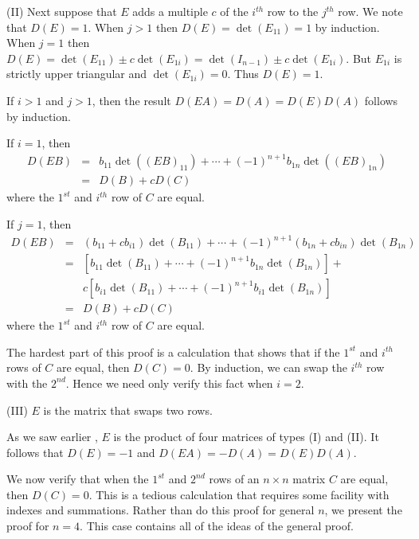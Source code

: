 \documentclass{ximera}
\begin{document}
\noindent (II) Next suppose that $E$ adds a multiple $c$ of the
$i^{th}$ row to the $j^{th}$ row.  We note that $D(E)=1$.  When
$j>1$ then $D(E)=\det(E_{11})=1$ by induction.  When $j=1$ then
$D(E)= \det(E_{11})\pm c\det(E_{1i})=\det(I_{n-1})\pm
c\det(E_{1i})$. But $E_{1i}$ is strictly upper triangular and
$\det(E_{1i})=0$.  Thus $D(E)=1$. 

If $i>1$ and $j>1$, then the result $D(EA)=D(A)=D(E)D(A)$
follows by induction.  

If $i=1$, then
\begin{eqnarray*}
D(EB) & = & b_{11}\det((EB)_{11})+\cdots+(-1)^{n+1}b_{1n}\det((EB)_{1n})\\
& = & D(B) + cD(C)
\end{eqnarray*}
where the $1^{st}$ and $i^{th}$ row of $C$ are equal.

If $j=1$, then 
\begin{eqnarray*}
D(EB) & = & (b_{11}+cb_{i1})\det(B_{11}) +\cdots+ 
(-1)^{n+1}(b_{1n}+cb_{in})\det(B_{1n})\\
& = &
\left[b_{11}\det(B_{11})+\cdots+(-1)^{n+1}b_{1n}\det(B_{1n})\right]
+ 
\\ & & 
        c\left[b_{i1}\det(B_{11})+\cdots+(-1)^{n+1}b_{i1}\det(B_{1n})\right]\\
& = & D(B) + cD(C)
\end{eqnarray*}
where the $1^{st}$ and $i^{th}$ row of $C$ are equal.  

The hardest part of this proof is a calculation that shows that
if the $1^{st}$ and $i^{th}$ rows of $C$ are equal, then
$D(C)=0$.  By induction, we can swap the $i^{th}$ row with the
$2^{nd}$.  Hence we need only verify this fact when $i=2$. 

\noindent (III) $E$ is the matrix that swaps two rows.   

As we saw earlier , $E$ is the product of four
matrices of types (I) and (II).  It follows that $D(E)=-1$ and
$D(EA)=-D(A)=D(E)D(A)$.  

We now verify that when the $1^{st}$ and $2^{nd}$ rows of an
$n\times n$ matrix $C$ are equal, then $D(C)=0$.  This is a
tedious calculation that requires some facility with indexes and
summations.  Rather than do this proof for general $n$, we
present the proof for $n=4$.  This case contains all of the
ideas of the general proof.  
\end{document}
